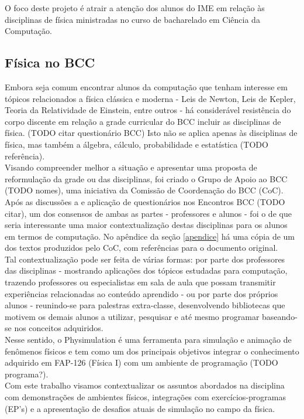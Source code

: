 
O foco deste projeto é atrair a atenção dos alunos do IME em relação às disciplinas de física ministradas no curso de bacharelado em Ciência da Computação.

\subsection{Física no BCC}
Embora seja comum encontrar alunos da computação que tenham interesse em tópicos relacionados a física clássica e moderna - Leis de Newton, Leis de Kepler, Teoria da Relatividade de Einstein, entre outros - há considerável resistência do corpo discente em relação a grade curricular do BCC incluir as disciplinas de física. (TODO citar questionário BCC) Isto não se aplica apenas às disciplinas de física, mas também a álgebra, cálculo, probabilidade e estatística (TODO referência). \\

Visando compreender melhor a situação e apresentar uma proposta de reformulação da grade ou das disciplinas, foi criado o Grupo de Apoio ao BCC (TODO nomes), uma iniciativa da Comissão de Coordenação do BCC (CoC). Após as discussões a e aplicação de questionários nos Encontros BCC (TODO citar), um dos consensos de ambas as partes - professores e alunos - foi o de que seria interessante uma maior contextualização destas disciplinas para os alunos em termos de computação. No apêndice da seção \ref{apendice} há uma cópia de um dos textos produzidos pelo CoC, com referências para o documento original. \\

Tal contextualização pode ser feita de várias formas: por parte dos professores das disciplinas - mostrando aplicações dos tópicos estudadas para computação, trazendo professores ou especialistas em sala de aula que possam transmitir experiências relacionadas ao conteúdo aprendido - ou por parte dos próprios alunos - reunindo-se para palestras extra-classe, desenvolvendo bibliotecas que motivem os demais alunos a utilizar, pesquisar e até mesmo programar baseando-se nos conceitos adquiridos. \\

Nesse sentido, o Physimulation é uma ferramenta para simulação e animação de fenômenos físicos e tem como um dos principais objetivos integrar o conhecimento adquirido em FAP-126 (Física I) com um ambiente de programação (TODO programa?). \\

Com este trabalho visamos contextualizar os assuntos abordados na disciplina com demonstrações de ambientes físicos, integrações com exercícios-programas (EP's) e a apresentação de desafios atuais de simulação no campo da física. 

